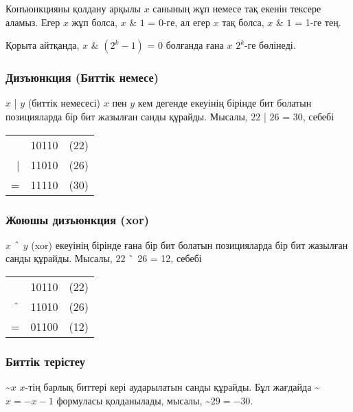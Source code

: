 Конъюнкцияны қолдану арқылы $x$ санының жұп немесе тақ екенін тексере аламыз. Егер $x$ жұп болса, $x$ \& $1$ = 0-ге, ал
егер $x$ тақ болса, $x$ \& $1$ = 1-ге тең.

Қорыта айтқанда, $x$ \& $(2^k-1)$ = 0
болғанда ғана $x$ $2^k$-ге  бөлінеді.

\subsubsection{Дизъюнкция (Биттік немесе)} 


$x$ | $y$  (биттік немесесі) $x$ пен $y$ кем дегенде 
екеуінің бірінде бит болатын
позицияларда бір бит жазылған санды құрайды. 
Мысалы, $22$ | $26$ = 30, себебі

\begin{center}
\begin{tabular}{rrr}
& 10110 & (22)\\
| & 11010 & (26) \\
\hline
 = & 11110 & (30) \\
\end{tabular}
\end{center}

\subsubsection{Жоюшы дизъюнкция (xor)} %


$x$ $\XOR$ $y$  (xor) екеуінің 
бірінде ғана бір бит болатын
позицияларда бір бит жазылған санды құрайды.
Мысалы, $22$ $\XOR$ $26$ = 12, себебі 

\begin{center}
\begin{tabular}{rrr}
& 10110 & (22)\\
$\XOR$ & 11010 & (26) \\
\hline
 = & 01100 & (12) \\
\end{tabular}
\end{center}

\subsubsection{Биттік терістеу} 


\textasciitilde$x$ 
$x$-тің барлық биттері кері аударылатын санды құрайды. Бұл жағдайда
\textasciitilde$x = -x-1$ формуласы қолданылады, мысалы,
\textasciitilde$29 = -30$.

